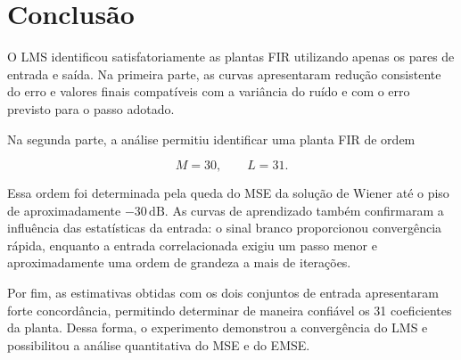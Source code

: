 \documentclass[11pt,a4paper,oneside]{report}
\begin{document}
\section{Conclusão}

O LMS identificou satisfatoriamente as plantas FIR utilizando apenas os pares de entrada e saída. Na primeira parte, as curvas apresentaram redução consistente do erro e valores finais compatíveis com a variância do ruído e com o erro previsto para o passo adotado.

Na segunda parte, a análise permitiu identificar uma planta FIR de ordem

\begin{equation}
    M=30,\qquad L=31.
\end{equation}

Essa ordem foi determinada pela queda do MSE da solução de Wiener até o piso de aproximadamente
\(-30\,\mathrm{dB}\). As curvas de aprendizado também confirmaram a influência das estatísticas da entrada: o sinal branco proporcionou convergência rápida, enquanto a entrada correlacionada exigiu um passo menor e aproximadamente uma ordem de grandeza a mais de iterações.

Por fim, as estimativas obtidas com os dois conjuntos de entrada apresentaram forte concordância, permitindo determinar de maneira confiável os 31 coeficientes da planta. Dessa forma, o experimento demonstrou a convergência do LMS e possibilitou a análise quantitativa do MSE e do EMSE.
\end{document}
